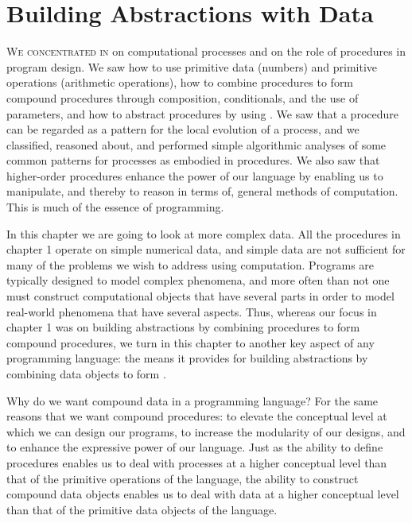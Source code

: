 \chapter{Building Abstractions with Data}
\label{Chapter 2}


\vspace{2em}

\lettrine[findent=1pt]{W}{e concentrated in}  on computational processes and on the role of procedures in program design.
We saw how to use primitive data (numbers) and primitive operations (arithmetic operations), how to combine procedures to form compound procedures through composition, conditionals, and the use of parameters, and how to abstract procedures by using .
We saw that a procedure can be regarded as a pattern for the local evolution of a process, and we classified, reasoned about, and performed simple algorithmic analyses of some common patterns for processes as embodied in procedures.
We also saw that higher-order procedures enhance the power of our language by enabling us to manipulate, and thereby to reason in terms of, general methods of computation.
This is much of the essence of programming.

In this chapter we are going to look at more complex data.
All the procedures in chapter 1 operate on simple numerical data, and simple data are not sufficient for many of the problems we wish to address using computation.
Programs are typically designed to model complex phenomena, and more often than not one must construct computational objects that have several parts in order to model real-world phenomena that have several aspects.
Thus, whereas our focus in chapter 1 was on building abstractions by combining procedures to form compound procedures, we turn in this chapter to another key aspect of any programming language:
the means it provides for building abstractions by combining data objects to form .

Why do we want compound data in a programming language?
For the same reasons that we want compound procedures:
to elevate the conceptual level at which we can design our programs, to increase the modularity of our designs, and to enhance the expressive power of our language.
Just as the ability to define procedures enables us to deal with processes at a higher conceptual level than that of the primitive operations of the language, the ability to construct compound data objects enables us to deal with data at a higher conceptual level than that of the primitive data objects of the language.

